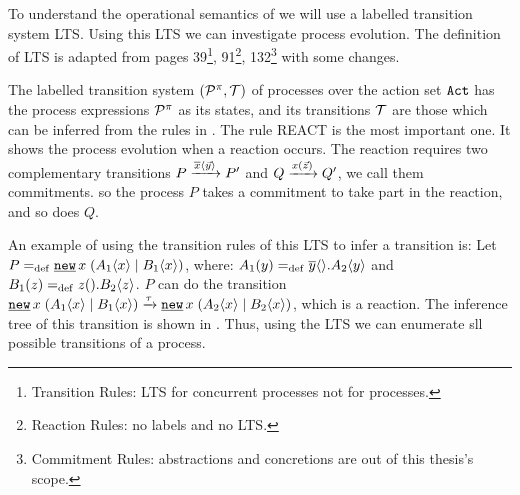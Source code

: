 To understand the operational semantics of \picalc{} we will use  a labelled transition system LTS. Using this LTS we can investigate \picalc{} process evolution. The definition of LTS is adapted from \cite{milner} pages 39\footnote{Transition Rules: LTS for concurrent processes not for \picalc{} processes.}, 91\footnote{Reaction Rules: no labels and no LTS.}, 132\footnote{Commitment Rules: abstractions and concretions are out of this thesis's scope.} with some changes.

\begin{definition}
\label{def_trans_system}
The labelled transition system $(\procs,\traces)$ of \picalc{} processes over the action set $\mathtt{Act}$ has the process expressions $\mathcal P^{\pi}$ as its states, and its transitions $\traces$ are those which can be inferred from the rules in .
The rule REACT is the most important one. It shows the process evolution when a reaction occurs. The reaction requires two complementary transitions $P \xrightarrow{\overline{x}\langle\vec{y}\rangle} P'$ and $Q \xrightarrow{x(\vec{z})} Q'$, we call them commitments. so the process $P$ takes a commitment to take part in the reaction, and so does $Q$.

\end{definition}


An example of using the transition rules of this LTS to infer a transition is: Let $P\define\procres{x}{(\procpar{\proccall{A_1}{x}}{\proccall{B_1}{x}})}$, where: $A_1(y)=_{\mathrm{def}}{}\overline{y}\langle{}\rangle.A_2\langle y\rangle$ and $B_1(z)=_{\mathrm{def}}{}z({}).B_2\langle z\rangle$. $P$ can do the transition $\procres{x}{(\procpar{\proccall{A_1}{x}}{\proccall{B_1}{x}})} \transs{\tau} \procres{x}{(\procpar{\proccall{A_2}{x}}{\proccall{B_2}{x}})}$, which is a reaction. The inference tree of this transition is shown in . Thus, using the LTS we can enumerate sll possible transitions of a \picalc{} process.



